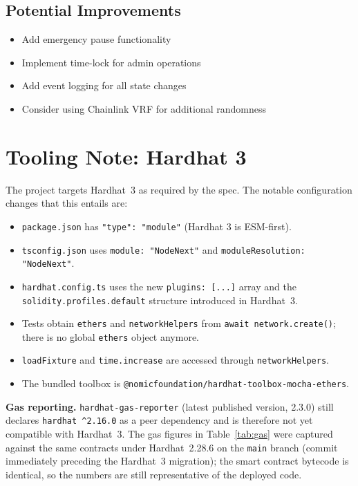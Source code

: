 \documentclass[12pt,a4paper]{article}
\begin{document}
\subsection{Potential Improvements}

\begin{itemize}
    \item Add emergency pause functionality
    \item Implement time-lock for admin operations
    \item Add event logging for all state changes
    \item Consider using Chainlink VRF for additional randomness
\end{itemize}

\section{Tooling Note: Hardhat 3}

The project targets Hardhat~3 as required by the spec. The notable
configuration changes that this entails are:
\begin{itemize}
    \item \texttt{package.json} has \texttt{"type": "module"} (Hardhat 3 is ESM-first).
    \item \texttt{tsconfig.json} uses \texttt{module: "NodeNext"} and \texttt{moduleResolution: "NodeNext"}.
    \item \texttt{hardhat.config.ts} uses the new \texttt{plugins: [...]} array and the \texttt{solidity.profiles.default} structure introduced in Hardhat~3.
    \item Tests obtain \texttt{ethers} and \texttt{networkHelpers} from \texttt{await network.create()}; there is no global \texttt{ethers} object anymore.
    \item \texttt{loadFixture} and \texttt{time.increase} are accessed through \texttt{networkHelpers}.
    \item The bundled toolbox is \texttt{@nomicfoundation/hardhat-toolbox-mocha-ethers}.
\end{itemize}

\textbf{Gas reporting.} \texttt{hardhat-gas-reporter} (latest published
version, 2.3.0) still declares \texttt{hardhat~\^{}2.16.0} as a peer
dependency and is therefore not yet compatible with Hardhat~3. The gas
figures in Table~\ref{tab:gas} were captured against the same contracts
under Hardhat~2.28.6 on the \texttt{main} branch (commit immediately
preceding the Hardhat~3 migration); the smart contract bytecode is
identical, so the numbers are still representative of the deployed code.
\end{document}
